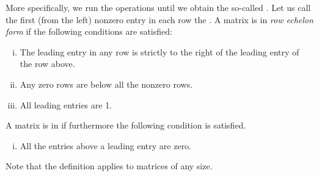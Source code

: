 More specifically, we run the operations until we obtain the so-called
\emph{}.
Let us call
the first (from the left) nonzero entry in each row the
\emph{}.  
A matrix is in \emph{row echelon form} if
the following conditions are satisfied:
\begin{enumerate}[(i)]
\item The leading entry in any row is strictly to the right of
the leading entry of the row above.
\item Any zero rows are below all the nonzero rows.
\item All leading entries are 1.
\end{enumerate}
A matrix is in \emph{}
if furthermore the following condition is satisfied.
\begin{enumerate}[(i),resume]
\item All the entries above a leading entry are zero.
\end{enumerate}

Note that the definition applies to matrices of any size.


